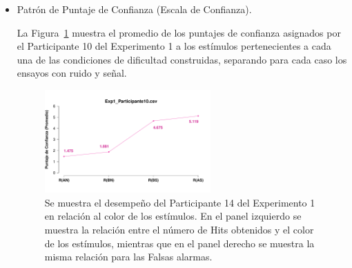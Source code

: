 \begin{itemize}
La comparación entre los Hits y Falsas Alarmas de cada condición de dificultad para el resto de los participantes de los Experimentos 1 y 2, se muestran en las Figuras~\ref{fig:MRate_E1} y ~\ref{fig:MRate_E2}.

\item Patrón de Puntaje de Confianza (Escala de Confianza).

La Figura~\ref{fig:MirrorRating_E1_P10} muestra el promedio de los puntajes de confianza asignados por el Participante 10 del Experimento 1 a los estímulos pertenecientes a cada una de las condiciones de dificultad construidas, separando para cada caso los ensayos con ruido y señal. 

\begin{figure}[th]
\centering
\includegraphics[width=0.60\textwidth]{Figures/MirrorRating_Exp1_P10}
\caption[Comparación entre Puntajes de Confianza asignados por Condición; Ejemplo]{Se muestra el desempeño del Participante 14 del Experimento 1 en relación al color de los estímulos. En el panel izquierdo se muestra la relación entre el número de Hits obtenidos y el color de los estímulos, mientras que en el panel derecho se muestra la misma relación para las Falsas alarmas.}
\label{fig:MirrorRating_E1_P10}
\end{figure}

\end{itemize}




















